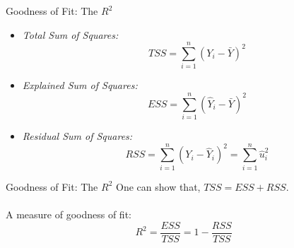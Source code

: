 \documentclass{./../div_teaching_slides}
\begin{document}
\begin{frame}{Goodness of Fit: The $R^2$}
\begin{itemize}
\item[]   \textit{Total Sum of Squares:} $$ \quad TSS = \sum_{i=1}^n (Y_i-\bar{Y})^2 $$
\item[]  \textit{Explained Sum of Squares:} $$ \quad ESS = \sum_{i=1}^n (\hat{Y}_i-\bar{Y})^2 $$
\item[]   \textit{Residual Sum of Squares:} $$ \quad RSS = \sum_{i=1}^n (Y_i-\hat{Y}_i)^2 =\sum_{i=1}^n \hat{u}_i^2$$
\end{itemize}
\end{frame}


\begin{frame}{Goodness of Fit: The $R^2$}
One can show that, $TSS = ESS + RSS$. \\~\\
A measure of goodness of fit: 
$$ R^2 = \frac{ESS}{TSS} = 1-\frac{RSS}{TSS} $$
\end{frame}
\end{document}
